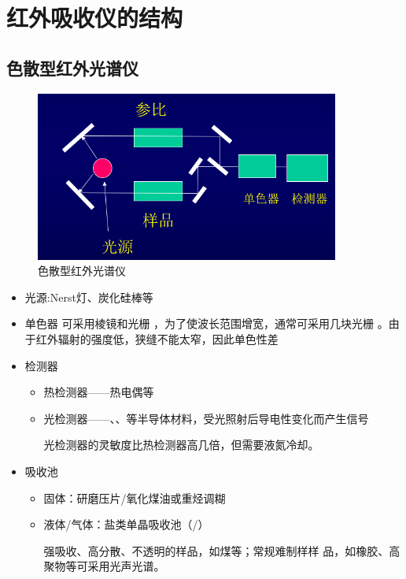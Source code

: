\section{红外吸收仪的结构}
\subsection{色散型红外光谱仪}
\begin{figure}[ht]
    \centering
    \includegraphics[width=10cm]{image/chp5_ord_ins.png}
    \caption{色散型红外光谱仪}
    \label{fig:ordin_ins}
\end{figure}
\begin{itemize}
    \item 光源:Nerst灯、炭化硅棒等
    \item 单色器
可采用棱镜和光栅
，为了使波长范围增宽，通常可采用几块光栅
。由于红外辐射的强度低，狭缝不能太窄，因此单色性差
    \item 检测器
    \begin{itemize}
        \item 热检测器——热电偶等
        \item 光检测器——、、等半导体材料，受光照射后导电性变化而产生信号
        \begin{note}
            光检测器的灵敏度比热检测器高几倍，但需要液氮冷却。
        \end{note}
    \end{itemize}
    \item  吸收池
    \begin{itemize}
        \item 固体：研磨压片/氧化煤油或重烃调糊
        \item 液体/气体：盐类单晶吸收池（/）
        \begin{note}
强吸收、高分散、不透明的样品，如煤等；常规难制样样
品，如橡胶、高聚物等可采用光声光谱。
        \end{note}
    \end{itemize}

		   
\end{itemize}
